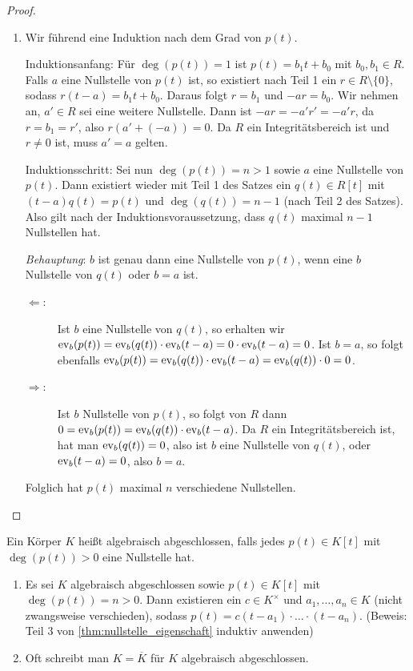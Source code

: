 \documentclass[12pt,a4paper]{scrartcl}
\begin{document}
\begin{proof}
\begin{enumerate}
		\item Wir führend eine Induktion nach dem Grad von $p(t)$.
		
		
			Induktionsanfang: Für $\deg(p(t)) = 1$ ist $p(t) = b_1t+b_0$ mit $b_0,b_1\in R$. Falls $a$ eine Nullstelle von $p(t)$ ist, so existiert nach Teil 1 ein $r\in R\setminus\{0\}$, sodass $r(t-a) = b_1t+b_0$. Daraus folgt $r = b_1$ und $-ar = b_0$. Wir nehmen an, $a' \in R$ sei eine weitere Nullstelle. Dann ist $-ar = -a'r' = -a'r$, da $r = b_1 = r'$, also $r(a'+(-a)) = 0$. Da $R$ ein Integritätsbereich ist und $r\neq 0$ ist, muss $a' = a$ gelten.
			
			
			Induktionsschritt: Sei nun $\deg(p(t)) = n>1$ sowie $a$ eine Nullstelle von $p(t)$. Dann existiert wieder mit Teil 1 des Satzes ein $q(t)\in R[t]$ mit $(t-a) q(t) = p(t)$ und $\deg(q(t)) = n-1$ (nach Teil 2 des Satzes).
			Also gilt nach der Induktionsvoraussetzung, dass $q(t)$ 
			maximal $n-1$ Nullstellen hat.
			
			\emph{Behauptung}: $b$ ist genau dann eine Nullstelle von $p(t)$, wenn eine $b$ Nullstelle von $q(t)$ oder $b = a$ ist.
			
			\begin{description}
				\item[\glqq$\Leftarrow$\grqq:] Ist $b$ eine Nullstelle von $q(t)$, so erhalten wir $\operatorname{ev}_{b}(p(t)) = \operatorname{ev}_{b}(q(t))\cdot \operatorname{ev}_b(t-a) = 0\cdot \operatorname{ev}_{b}(t-a) = 0$. Ist $b=a$, so folgt ebenfalls $\operatorname{ev}_{b}(p(t)) = \operatorname{ev}_{b}(q(t))\cdot \operatorname{ev}_b(t-a) = \operatorname{ev}_{b}(q(t))\cdot 0 = 0$.
				\item[\glqq$\Rightarrow$\grqq:] Ist $b$ Nullstelle von $p(t)$, so folgt von $R$ dann $0 = \operatorname{ev}_{b}(p(t)) = \operatorname{ev}_{b}(q(t))\cdot \operatorname{ev}_{b}(t-a)$. Da $R$ ein Integritätsbereich ist, hat man $\operatorname{ev}_{b}(q(t)) = 0$, also ist $b$ eine Nullstelle von $q(t)$, oder $\operatorname{ev}_b(t-a) = 0$, also $b=a$.
			\end{description}
			
			Folglich hat $p(t)$ maximal $n$ verschiedene Nullstellen.
  \qedhere
	\end{enumerate}
\end{proof}


\begin{defi}
	Ein Körper $K$ heißt algebraisch abgeschlossen, falls jedes $p(t)\in K[t]$ mit $\deg(p(t))>0$ eine Nullstelle hat.
\end{defi}
\begin{bem}
	\leavevmode
	\begin{enumerate}
		\item Es sei $K$ algebraisch abgeschlossen sowie $p(t)\in K[t]$ mit $\deg(p(t)) =n > 0$. Dann existieren ein $c\in K^{\times}$ und $ a_1,\dots,a_n\in K$ (nicht zwangsweise verschieden), sodass $p(t) = c(t-a_1)\cdot \dots \cdot (t-a_n)$. (Beweis: Teil 3 von \cref{thm:nullstelle_eigenschaft} induktiv anwenden)
		\item Oft schreibt man $K = \overline{K}$ für $K$ algebraisch abgeschlossen.
	\end{enumerate}
\end{bem}
\end{document}

